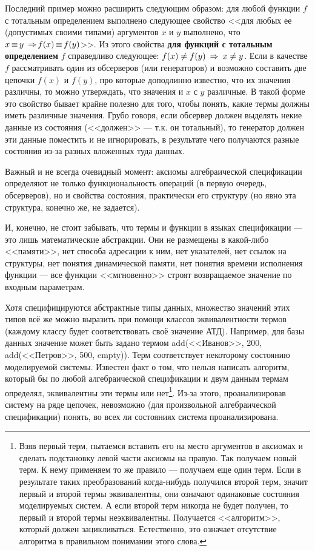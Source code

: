 Последний пример можно расширить следующим образом: для любой функции $f$ с тотальным определением выполнено следующее свойство <<для любых ее (допустимых своими типами) аргументов $x$ и $y$ выполнено, что $x \mathop{\equiv} y ~\mathop{\Rightarrow}~\\ f(x) \mathop{\equiv} f(y)$>>. Из этого свойства \textbf{для функций с тотальным определением} $f$ справедливо следующее: $f(x) \neq f(y) ~\mathop{\Rightarrow}~ x \neq y$. Если в качестве $f$ рассматривать один из обсерверов (или генераторов) и возможно составить две цепочки $f(x)$ и $f(y)$, про которые доподлинно известно, что их значения различны, то можно утверждать, что значения и $x$ с $y$ различные. В такой форме это свойство бывает крайне полезно для того, чтобы понять, какие термы должны иметь различные значения. Грубо говоря, если обсервер должен выделять некие данные из состояния (<<должен>> --- т.к. он тотальный), то генератор должен эти данные поместить и не игнорировать, в результате чего получаются разные состояния из-за разных вложенных туда данных.

Важный и не всегда очевидный момент: аксиомы алгебраической спецификации определяют не только функциональность операций (в первую очередь, обсерверов), но и свойства состояния, практически его структуру (но явно эта структура, конечно же, не задается).

И, конечно, не стоит забывать, что термы и функции в языках спецификации --- это лишь математические абстракции. Они не размещены в какой-либо <<памяти>>, нет способа адресации к ним, нет указателей, нет ссылок на структуры, нет понятия динамической памяти, нет понятия времени исполнения функции --- все функции <<мгновенно>> строят возвращаемое значение по входным параметрам.


Хотя специфицируются абстрактные типы данных, множество значений этих типов всё же можно выразить при помощи классов эквивалентности термов (каждому классу будет соответствовать своё значение АТД). Например, для базы данных значение может быть задано термом add(<<Иванов>>, 200, add(<<Петров>>, 500, empty)). Терм соответствует некоторому состоянию моделируемой системы. Известен факт о том, что нельзя написать алгоритм, который бы по любой алгебраической спецификации и двум данным термам определял, эквивалентны эти термы или нет\footnote{Взяв первый терм, пытаемся вставить его на место аргументов в аксиомах и сделать подстановку левой части аксиомы на правую. Так получаем новый терм. К нему применяем то же правило --- получаем еще один терм. Если в результате таких преобразований когда-нибудь получился второй терм, значит первый и второй термы эквивалентны, они означают одинаковые состояния моделируемых систем. А если второй терм никогда не будет получен, то первый и второй термы неэквивалентны. Получается <<алгоритм>>, который должен зацикливаться. Естественно, это означает отсутствие алгоритма в правильном понимании этого слова.}. Из-за этого, проанализировав систему на ряде цепочек, невозможно (для произвольной алгебраической спецификации) понять, во всех ли состояниях система проанализирована.

